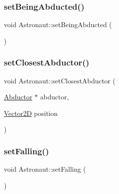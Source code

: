 \hypertarget{class_astronaut_aa5cf10cf36c34114a8ecda156879cf80}{}\label{class_astronaut_aa5cf10cf36c34114a8ecda156879cf80} 
\subsubsection{\texorpdfstring{set\+Being\+Abducted()}{setBeingAbducted()}}
{\footnotesize\ttfamily void Astronaut\+::set\+Being\+Abducted (\begin{DoxyParamCaption}{ }\end{DoxyParamCaption})}

\hypertarget{class_astronaut_a18df8dbedccb284469ad1f6e85948d3c}{}\label{class_astronaut_a18df8dbedccb284469ad1f6e85948d3c} 
\subsubsection{\texorpdfstring{set\+Closest\+Abductor()}{setClosestAbductor()}}
{\footnotesize\ttfamily void Astronaut\+::set\+Closest\+Abductor (\begin{DoxyParamCaption}\item[{\hyperlink{class_abductor}{Abductor} $\ast$}]{abductor,  }\item[{\hyperlink{class_vector2_d}{Vector2D}}]{position }\end{DoxyParamCaption})}

\hypertarget{class_astronaut_aca642a5da85bd7546c7750d87ffdad5c}{}\label{class_astronaut_aca642a5da85bd7546c7750d87ffdad5c} 
\subsubsection{\texorpdfstring{set\+Falling()}{setFalling()}}
{\footnotesize\ttfamily void Astronaut\+::set\+Falling (\begin{DoxyParamCaption}{ }\end{DoxyParamCaption})}

\hypertarget{class_astronaut_afd8ed3067d597c58ab901a6d3cca2b40}{}\label{class_astronaut_afd8ed3067d597c58ab901a6d3cca2b40} 
